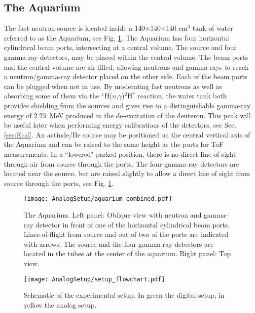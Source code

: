 \documentclass[main.tex]{subfiles}
\begin{document}
\subsection{The Aquarium}
The fast-neutron source is located inside a 140$\times$140$\times$140 \si{\cm}${}^\text{3}$ tank of water referred to as the Aquarium, see Fig. \ref{fig:aquarium}. The Aquarium has four horizontal cylindrical beam ports, intersecting at a central volume. The source and four gamma-ray detectors, may be placed within the central volume.  The beam ports and the central volume are air filled, allowing neutrons and gamma-rays to reach a neutron/gamma-ray detector placed on the other side. Each of the beam ports can be plugged when not in use.
By moderating fast neutrons as well as absorbing some of them via the $^{\text{1}}$H($n$,$\gamma$)$^{\text{2}}$H$^*$ reaction, the water tank both provides shielding from the sources and gives rise to a distinguishable gamma-ray energy of \SI{2.23}{MeV} produced in the de-excitation of the deuteron. This peak will be useful later when performing energy calibrations of the detectors, see Sec. \ref{sec:Ecal}. 
An actinde/Be source may be positioned on the central vertical axis of the Aquarium and can be raised to the same height as the ports for ToF measurements. In a ``lowered" parked position, there is no direct line-of-sight through air from source through the ports. The four gamma-ray detectors are located near the source, but are raised slightly to allow a direct line of sight from source through the ports, see Fig. \ref{fig:aquarium}.
\begin{figure}[ht]
	\center
    	\texttt{[image: AnalogSetup/aquarium\_combined.pdf]}
	\caption[The Aquarium]{The Aquarium. Left panel: Oblique view with neutron and gamma-ray detector in front of one of the horizontal cylindrical beam ports. Lines-of-flight from source and out of two of the ports are indicated with arrows. The source and the four gamma-ray detectors are located in the tubes at the center of the aquarium. Right panel: Top view.}
	\label{fig:aquarium}
\end{figure}

\begin{figure}[h]
    \centering
        \texttt{[image: AnalogSetup/setup\_flowchart.pdf]}
        \caption[Schematic of experimental setup]{Schematic of the experimental setup. In green the digital setup, in yellow the analog setup.}
    \label{fig:setup}
\end{figure}
\end{document}
